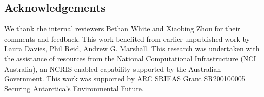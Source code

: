 \documentclass[tc, manuscript]{copernicus}
\begin{document}


\begin{acknowledgements}
\section{Acknowledgements}\label{acknowledgements}

We thank the internal reviewers Bethan White and Xiaobing Zhou for their
comments and feedback. This work benefited from earlier unpublished work
by Laura Davies, Phil Reid, Andrew G. Marshall. This research was
undertaken with the assistance of resources from the National
Computational Infrastructure (NCI Australia), an NCRIS enabled
capability supported by the Australian Government. This work was
supported by ARC SRIEAS Grant SR200100005 Securing Antarctica's
Environmental Future.
\end{acknowledgements}


\end{document}
